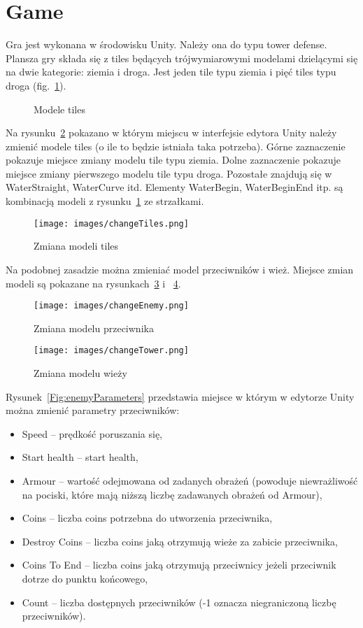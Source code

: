 
\section{Game}

Gra jest wykonana w środowisku Unity. Należy ona do typu tower defense. Plansza gry składa się z tiles będących trójwymiarowymi modelami dzielącymi się na dwie kategorie: ziemia i droga. Jest jeden tile typu ziemia i pięć tiles typu droga (fig.~\ref{Fig:tiles}).

\begin{figure}

\caption{Modele tiles}
\label{Fig:tiles}
\end{figure}  

Na rysunku~\ref{Fig:changeTiles} pokazano w którym miejscu w interfejsie edytora Unity należy zmienić modele tiles (o ile to będzie istniała taka  potrzeba). Górne zaznaczenie pokazuje miejsce zmiany modelu tile typu ziemia. Dolne zaznaczenie pokazuje miejsce zmiany pierwszego modelu tile typu droga. Pozostałe znajdują się w WaterStraight, WaterCurve itd. Elementy WaterBegin, WaterBeginEnd itp. są kombinacją modeli z rysunku~\ref{Fig:tiles} ze strzałkami. 

\begin{figure}
\texttt{[image: images/changeTiles.png]}
\caption{Zmiana modeli tiles}
\label{Fig:changeTiles}
\end{figure}  

Na podobnej zasadzie można zmieniać model przeciwników i wież. Miejsce zmian modeli są pokazane na rysunkach~\ref{Fig:changeEnemy} i ~\ref{Fig:changeTower}.

\begin{figure}
\texttt{[image: images/changeEnemy.png]}
\caption{Zmiana modelu przeciwnika}
\label{Fig:changeEnemy}
\end{figure}  


\begin{figure}
\texttt{[image: images/changeTower.png]}
\caption{Zmiana modelu wieży}
\label{Fig:changeTower}
\end{figure}  

Rysunek~\ref{Fig:enemyParameters}  przedstawia miejsce w którym w edytorze Unity można zmienić parametry przeciwników:
\begin{itemize}
\item Speed -- prędkość poruszania się,
\item Start health -- start health,
\item Armour -- wartość odejmowana od zadanych obrażeń (powoduje niewrażliwość na pociski, które mają niższą liczbę zadawanych obrażeń od Armour),
\item Coins -- liczba coins potrzebna do utworzenia przeciwnika,
\item Destroy Coins -- liczba coins jaką otrzymują wieże za zabicie przeciwnika,
\item Coins To End -- liczba coins jaką otrzymują przeciwnicy jeżeli przeciwnik dotrze do punktu końcowego,
\item Count -- liczba dostępnych przeciwników (-1 oznacza niegraniczoną liczbę przeciwników).  
\end{itemize}

